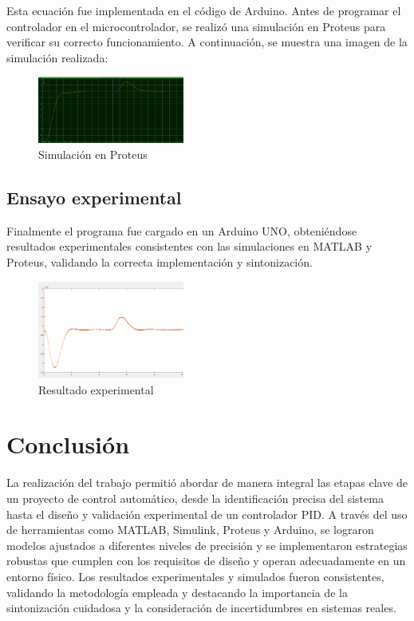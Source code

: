 \documentclass[letterpaper, 10 pt, conference]{ieeeconf}  %
\begin{document}
Esta ecuación fue implementada en el código de Arduino. 
Antes de programar el controlador en el microcontrolador, se realizó una simulación en Proteus para verificar su correcto funcionamiento. A continuación, se muestra una imagen de la simulación realizada:

\begin{figure}[H]
  \centering
  \includegraphics[width=0.43\textwidth]{./IMAGENES/pid7.png}
  \caption{Simulación en Proteus}
  \label{fig:pid7}
\end{figure}

\subsection{Ensayo experimental}

Finalmente el programa fue cargado en un Arduino UNO, obteniéndose resultados experimentales consistentes con las simulaciones en MATLAB y Proteus, validando la correcta implementación y sintonización.

\begin{figure}[htpb]
  \centering
  \includegraphics[width=0.43\textwidth]{./IMAGENES/pid8.png}
  \caption{Resultado experimental}
  \label{fig:pid8}
\end{figure}

\section{Conclusión}

La realización del trabajo permitió abordar de manera integral las etapas clave de un proyecto de control automático, desde la identificación precisa del sistema hasta el diseño y validación experimental de un controlador PID. A través del uso de herramientas como MATLAB, Simulink, Proteus y Arduino, se lograron modelos ajustados a diferentes niveles de precisión y se implementaron estrategias robustas que cumplen con los requisitos de diseño y operan adecuadamente en un entorno físico. Los resultados experimentales y simulados fueron consistentes, validando la metodología empleada y destacando la importancia de la sintonización cuidadosa y la consideración de incertidumbres en sistemas reales.
\end{document}
